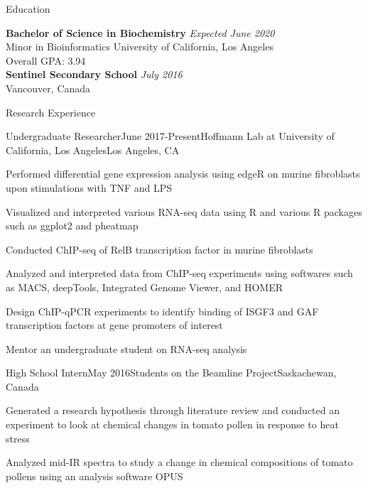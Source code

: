 \documentclass{resume} %
\begin{document}

\begin{rSection}{Education}

{\bf Bachelor of Science in Biochemistry } \hfill {\em Expected June 2020} \\ 
Minor in Bioinformatics \hfill  University of California, Los Angeles  \smallskip \\
Overall GPA: 3.94 \\[0.3cm]
{\bf Sentinel Secondary School} \hfill {\em July 2016} \\ 
Vancouver, Canada 
\end{rSection}


\begin{rSection}{Research Experience}

\begin{rSubsection}{Undergraduate Researcher}{June 2017-Present}{Hoffmann Lab at University of California, Los Angeles}{Los Angeles, CA}
\item Performed differential gene expression analysis using edgeR on murine fibroblasts upon stimulations with TNF and LPS
\item Visualized and interpreted various RNA-seq data using R and various R packages such as ggplot2 and pheatmap
\item Conducted ChIP-seq of RelB transcription factor in murine fibroblasts 
\item Analyzed and interpreted data from ChIP-seq experiments using softwares such as MACS, deepTools, Integrated Genome Viewer, and HOMER
\item Design ChIP-qPCR experiments to identify binding of ISGF3 and GAF transcription factors at gene promoters of interest
\item Mentor an undergraduate student on RNA-seq analysis
\end{rSubsection}



\begin{rSubsection}{High School Intern}{May 2016}{Students on the Beamline Project}{Saskachewan, Canada}
\item Generated a research hypothesis through literature review and conducted an experiment to look at chemical changes in tomato pollen in response to heat stress
\item Analyzed mid-IR spectra to study a change in chemical compositions of tomato pollens using an analysis software OPUS
\end{rSubsection}\end{rSection}
\end{document}
